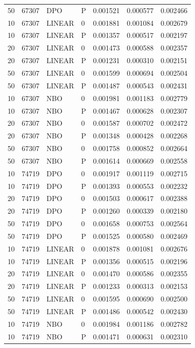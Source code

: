 \begin{longtable}{rrllrrr}
50 & 67307 & DPO & P & 0.001521 & 0.000577 & 0.002466\\
10 & 67307 & LINEAR & 0 & 0.001881 & 0.001084 & 0.002679\\
10 & 67307 & LINEAR & P & 0.001357 & 0.000517 & 0.002197\\
20 & 67307 & LINEAR & 0 & 0.001473 & 0.000588 & 0.002357\\
20 & 67307 & LINEAR & P & 0.001231 & 0.000310 & 0.002151\\
50 & 67307 & LINEAR & 0 & 0.001599 & 0.000694 & 0.002504\\
50 & 67307 & LINEAR & P & 0.001487 & 0.000543 & 0.002431\\
10 & 67307 & NBO & 0 & 0.001981 & 0.001183 & 0.002779\\
10 & 67307 & NBO & P & 0.001467 & 0.000628 & 0.002307\\
20 & 67307 & NBO & 0 & 0.001587 & 0.000702 & 0.002472\\
20 & 67307 & NBO & P & 0.001348 & 0.000428 & 0.002268\\
50 & 67307 & NBO & 0 & 0.001758 & 0.000852 & 0.002664\\
50 & 67307 & NBO & P & 0.001614 & 0.000669 & 0.002558\\
10 & 74719 & DPO & 0 & 0.001917 & 0.001119 & 0.002715\\
10 & 74719 & DPO & P & 0.001393 & 0.000553 & 0.002232\\
20 & 74719 & DPO & 0 & 0.001503 & 0.000617 & 0.002388\\
20 & 74719 & DPO & P & 0.001260 & 0.000339 & 0.002180\\
50 & 74719 & DPO & 0 & 0.001658 & 0.000753 & 0.002564\\
50 & 74719 & DPO & P & 0.001525 & 0.000580 & 0.002469\\
10 & 74719 & LINEAR & 0 & 0.001878 & 0.001081 & 0.002676\\
10 & 74719 & LINEAR & P & 0.001356 & 0.000515 & 0.002196\\
20 & 74719 & LINEAR & 0 & 0.001470 & 0.000586 & 0.002355\\
20 & 74719 & LINEAR & P & 0.001233 & 0.000313 & 0.002153\\
50 & 74719 & LINEAR & 0 & 0.001595 & 0.000690 & 0.002500\\
50 & 74719 & LINEAR & P & 0.001486 & 0.000542 & 0.002430\\
10 & 74719 & NBO & 0 & 0.001984 & 0.001186 & 0.002782\\
10 & 74719 & NBO & P & 0.001471 & 0.000631 & 0.002310\\

\end{longtable}
